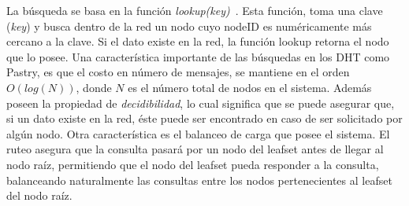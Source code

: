 La búsqueda se basa en la función
\textit{lookup(key)}~\cite{BalakrishnanEtAl03}. Esta función, toma una
clave (\textit{key}) y busca dentro de la red un nodo cuyo nodeID es
numéricamente más cercano a la clave.  Si el dato existe en la red, la función
lookup retorna el nodo que lo posee.  Una característica importante de las
búsquedas en los DHT como Pastry, es que el costo en número de mensajes, se
mantiene en el orden $O(log(N ))$, donde $N$ es el número total de nodos en el
sistema. Además poseen la propiedad de \textit{decidibilidad}, lo cual significa
que se puede asegurar que, si un dato existe en la red, éste puede ser
encontrado en caso de ser solicitado por algún nodo. Otra característica es el
balanceo de carga que posee el sistema. El ruteo asegura
que la consulta pasará por un nodo del leafset antes de llegar al nodo raíz,
permitiendo que el nodo del leafset pueda responder a la consulta, balanceando naturalmente las
consultas entre los nodos pertenecientes al leafset del nodo raíz.



